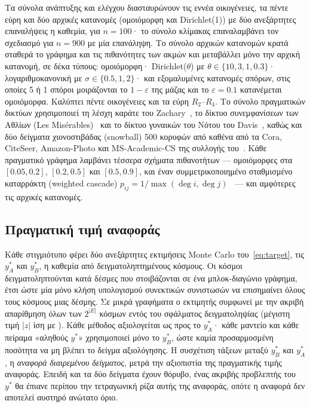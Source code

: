 \documentclass[11pt,a4paper]{article}
\theoremstyle{definition}
\theoremstyle{plain}
\begin{document}
Τα σύνολα ανάπτυξης και ελέγχου διασταυρώνουν τις εννέα οικογένειες, τα πέντε εύρη και δύο αρχικές κατανομές (ομοιόμορφη και Dirichlet(1)) με δύο ανεξάρτητες επαναλήψεις η καθεμία, για $n=100$· το σύνολο κλίμακας επαναλαμβάνει τον σχεδιασμό για $n=900$ με μία επανάληψη. Το σύνολο αρχικών κατανομών κρατά σταθερά το γράφημα και τις πιθανότητες των ακμών και μεταβάλλει μόνο την αρχική κατανομή, σε δέκα τύπους: ομοιόμορφη· Dirichlet($\theta$) με $\theta\in\{10,3,1,0.3\}$· λογαριθμοκανονική με $\sigma\in\{0.5,1,2\}$· και εξομαλυμένες κατανομές σπόρων, στις οποίες 5 ή 1 σπόροι μοιράζονται το $1-\varepsilon$ της μάζας και το $\varepsilon=0.1$ κατανέμεται ομοιόμορφα. Καλύπτει πέντε οικογένειες και τα εύρη $R_2$--$R_4$. Το σύνολο πραγματικών δικτύων χρησιμοποιεί τη λέσχη καράτε του Zachary~\cite{zachary77}, το δίκτυο συνεμφανίσεων των Αθλίων (Les Misérables)~\cite{knuth93} και το δίκτυο γυναικών του Νότου του Davis~\cite{davis41}, καθώς και δύο δείγματα χιονοστιβάδας (snowball) 500 κορυφών από καθένα από τα Cora, CiteSeer, Amazon-Photo και MS-Academic-CS της συλλογής του~\cite{shchur18}. Κάθε πραγματικό γράφημα λαμβάνει τέσσερα σχήματα πιθανοτήτων --- ομοιόμορφες στα $[0.05,0.2]$, $[0.2,0.5]$ και $[0.5,0.9]$, και έναν συμμετρικοποιημένο σταθμισμένο καταρράκτη (weighted cascade) $p_{ij}=1/\max(\deg i,\deg j)$~\cite{kkt03} --- και αμφότερες τις αρχικές κατανομές.

\TabPanels

\subsection{Πραγματική τιμή αναφοράς}\label{sec:gt}

Κάθε στιγμιότυπο φέρει δύο ανεξάρτητες εκτιμήσεις Monte Carlo του~\eqref{eq:target}, τις $y^*_A$ και $y^*_B$, η καθεμία από \MGTsp{} δειγματοληπτημένους κόσμους. Οι κόσμοι δειγματοληπτούνται κατά δέσμες που στοιβάζονται σε ένα μπλοκ-διαγώνιο γράφημα, έτσι ώστε μία μόνο κλήση υπολογισμού συνεκτικών συνιστωσών να επισημαίνει όλους τους κόσμους μιας δέσμης. Σε μικρά γραφήματα ο εκτιμητής συμφωνεί με την ακριβή απαρίθμηση όλων των $2^{|E|}$ κόσμων εντός του σφάλματος δειγματοληψίας (μέγιστη τιμή $|z|$ ίση με \MCExactZ). Κάθε μέθοδος αξιολογείται ως προς το $y^*_A$· κάθε μαντείο και κάθε πείραμα «αληθούς $y^*$» χρησιμοποιεί μόνο το $y^*_B$, ώστε καμία προσαρμοσμένη ποσότητα να μη βλέπει το δείγμα αξιολόγησης. Η συσχέτιση τάξεων μεταξύ $y^*_B$ και $y^*_A$, η \emph{αναφορά διαιρεμένου δείγματος}, μετρά την αξιοπιστία της πραγματικής τιμής αναφοράς. Επειδή και τα δύο δείγματα έχουν θόρυβο, ένας ακριβής προβλεπτής του $y^*$ θα έπιανε περίπου την τετραγωνική ρίζα αυτής της αναφοράς, οπότε η αναφορά δεν αποτελεί αυστηρό ανώτατο όριο.
\end{document}

